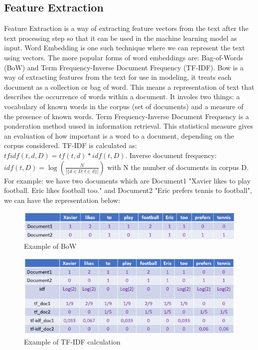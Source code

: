 \documentclass[a4paper,12pt]{report}
\begin{document}
    \subsection{Feature Extraction}
    Feature Extraction is a way of extracting feature vectors from the text after the text processing step so that it can be used in the machine learning model as input.
    Word Embedding is one such technique where we can represent the text using vectors. The more popular forms of word embeddings are:
    Bag-of-Words (BoW) and Term Frequency-Inverse Document Frequency (TF-IDF).
    \newline\newline
    Bow is a way of extracting features from the text for use in modeling, it treats each document as a collection or bag of word. This means a representation of text that describes the occurrence of words within a document.
    It involes two things: a vocabulary of known words in the corpus (set of documents) and a measure of the presence of known words.
    Term Frequency-Inverse Document Frequency is a ponderation method uused in information retrieval. This statistical measure gives an evaluation of how important is a word to a document, depending on the corpus considered.
    TF-IDF is calculated as: $tfidf(t,d,D) = tf(t,d) * idf(t,D)$.
    Inverse document frequency:
    \begin{math}
        idf(t,D) = \log(\frac{N}{|\{d\in D:t\in d\}|})
    \end{math}
    with N the number of documents in corpus D.
    \newline\newline
    For example: we have two documents which are Document1 "Xavier likes to play football. Eric likes football too." and Document2 "Eric prefers tennis to football", we can have the representation below:
    \begin{figure}[!h]
        \includegraphics[width=\linewidth]{bow.png}
        \centering
        \caption{Example of BoW}
    \end{figure}

    \begin{figure}[!h]
        \includegraphics[width=\linewidth]{tf-idf.png}
        \centering
        \caption{Example of TF-IDF calculation}
    \end{figure}
\end{document}
